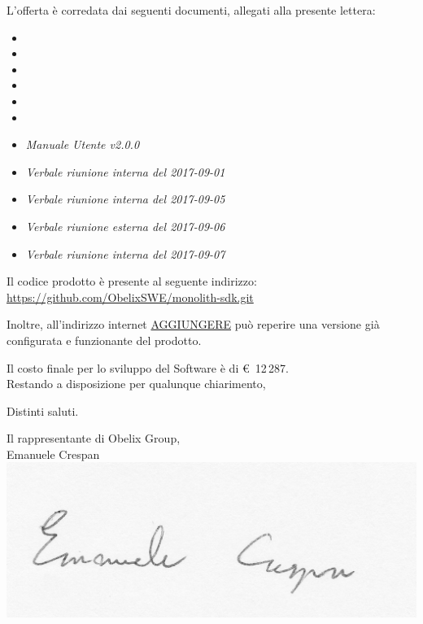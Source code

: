 \documentclass[10 pt,a4paper]{article}
\begin{document}
L'offerta è corredata dai seguenti documenti, allegati alla presente
lettera:
\vspace{.1in}
\begin{itemize}
\item \analisideirequisiti
\item \pianodiprogetto
\item \pianodiqualifica
\item \normediprogetto
\item \gloss
\item {}
\item \emph{Manuale Utente v2.0.0}
\item \emph{Verbale riunione interna del 2017-09-01}
\item \emph{Verbale riunione interna del 2017-09-05}
\item \emph{Verbale riunione esterna del 2017-09-06}
\item \emph{Verbale riunione interna del 2017-09-07}
\end{itemize}

Il codice prodotto è presente al seguente indirizzo: \\
\url{https://github.com/ObelixSWE/monolith-sdk.git}

\clearpage

Inoltre, all'indirizzo internet \url{AGGIUNGERE} può reperire una versione già configurata e funzionante del prodotto. \\


\vspace{.1in}


Il costo finale per lo sviluppo del Software è di \euro  \, 12\,287. \\

\vspace{.1in}
Restando a disposizione per qualunque chiarimento,\\

\vspace{.1in}

Distinti saluti.

\vspace{.15in}


\begin{flushright}
Il rappresentante di Obelix Group,\\
Emanuele Crespan\\
\includegraphics[width=.5\textwidth]{../../file_comuni/firme/ec.jpg}
\end{flushright}
\end{document}
